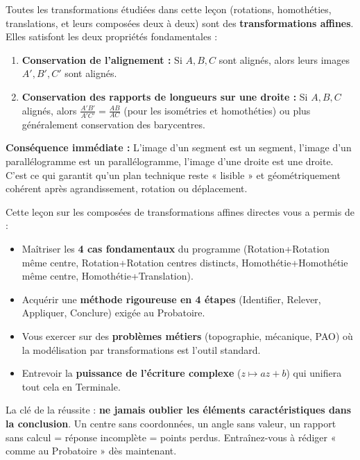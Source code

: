 \documentclass[11pt]{article}
\newcounter{popsec}
\newcounter{popsub}
\newcommand{\courssub}[1]{%
  \stepcounter{popsub}%
  \par\vspace{9pt}\noindent{\popxbold\fontsize{11.5}{13}\selectfont\color{popink}{\color{poporange}\thepopsec.\thepopsub}\hspace{6pt}#1}\par\nopagebreak\vspace{4pt}
}
\begin{document}
\begin{propriete}
Toutes les transformations étudiées dans cette leçon (rotations, homothéties, translations, et leurs composées deux à deux) sont des \textbf{transformations affines}.
Elles satisfont les deux propriétés fondamentales :
\begin{enumerate}
    \item \textbf{Conservation de l'alignement :} Si $A, B, C$ sont alignés, alors leurs images $A', B', C'$ sont alignés.
    \item \textbf{Conservation des rapports de longueurs sur une droite :} Si $A, B, C$ alignés, alors $\frac{A'B'}{A'C'} = \frac{AB}{AC}$ (pour les isométries et homothéties) ou plus généralement conservation des barycentres.
\end{enumerate}
\textbf{Conséquence immédiate :} L'image d'un segment est un segment, l'image d'un parallélogramme est un parallélogramme, l'image d'une droite est une droite. C'est ce qui garantit qu'un plan technique reste « lisible » et géométriquement cohérent après agrandissement, rotation ou déplacement.
\end{propriete}

\courssub{En résumé}

Cette leçon sur les composées de transformations affines directes vous a permis de :
\begin{itemize}
    \item Maîtriser les \textbf{4 cas fondamentaux} du programme (Rotation+Rotation même centre, Rotation+Rotation centres distincts, Homothétie+Homothétie même centre, Homothétie+Translation).
    \item Acquérir une \textbf{méthode rigoureuse en 4 étapes} (Identifier, Relever, Appliquer, Conclure) exigée au Probatoire.
    \item Vous exercer sur des \textbf{problèmes métiers} (topographie, mécanique, PAO) où la modélisation par transformations est l'outil standard.
    \item Entrevoir la \textbf{puissance de l'écriture complexe} ($z \mapsto az+b$) qui unifiera tout cela en Terminale.
\end{itemize}
La clé de la réussite : \textbf{ne jamais oublier les éléments caractéristiques dans la conclusion}. Un centre sans coordonnées, un angle sans valeur, un rapport sans calcul = réponse incomplète = points perdus. Entraînez-vous à rédiger « comme au Probatoire » dès maintenant.

\newpage
\end{document}
